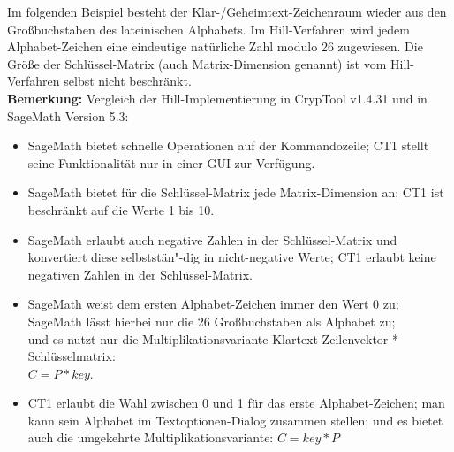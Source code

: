 \begin{refsegment}
\noindent Im folgenden Beispiel besteht der Klar-/Geheimtext-Zeichenraum wieder
aus den Großbuchstaben des lateinischen Alphabets. Im Hill-Verfahren wird
jedem Alphabet-Zeichen eine eindeutige natürliche Zahl modulo 26 zugewiesen.
Die Größe der Schlüssel-Matrix (auch Matrix-Dimension genannt) ist vom
Hill-Verfahren selbst nicht beschränkt.\\

\noindent \textbf{Bemerkung:} Vergleich der Hill-Implementierung in
CrypTool v1.4.31 und in SageMath Version 5.3:
\begin{itemize}
  \item SageMath bietet schnelle Operationen auf der Kommandozeile;
        CT1 stellt seine Funktionalität nur in einer GUI zur Verfügung.
  \item SageMath bietet für die Schlüssel-Matrix jede Matrix-Dimension an;
        CT1 ist beschränkt auf die Werte 1 bis 10.
  \item SageMath erlaubt auch negative Zahlen in der Schlüssel-Matrix
        und konvertiert diese selbststän"-dig in nicht-negative Werte;
        CT1 erlaubt keine negativen Zahlen in der Schlüssel-Matrix.
  \item SageMath weist dem ersten Alphabet-Zeichen immer den Wert 0 zu;\\
        SageMath lässt hierbei nur die 26 Großbuchstaben als Alphabet zu;\\
        und es nutzt nur die Multiplikationsvariante
        Klartext-Zeilenvektor * Schlüsselmatrix:\\
        $C = P * key$.
  \item CT1 erlaubt die Wahl zwischen 0 und 1 für das erste
        Alphabet-Zeichen; man kann sein Alphabet im Textoptionen-Dialog
        zusammen stellen; und es bietet auch die umgekehrte
        Multiplikationsvariante: $C = key * P$
\end{itemize}


\end{refsegment}

